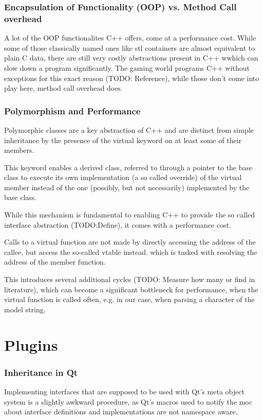 \subsubsection{Encapsulation of Functionality (OOP) vs. Method Call overhead}
A lot of the OOP functionalites C++ offers, come at a performance cost.
While some of those classically named ones like stl containers are almost equivalent to plain C data, there are still very costly abstractions present in C++ wwhich can slow down a program significantly.
The gaming world programs C++ without exceptions for this exact reason (TODO: Reference), while those don't come into play here, method call overhead does.

\subsubsection{Polymorphism and Performance}
Polymorphic classes are a key abstraction of C++ and are distinct from simple inheritance by the presence of the virtual keyword on at least some of their members.

This keyword enables a derived class, referred to through a pointer to the base class to execute its own implementation (a so called override) of the virtual member instead of the one (possibly, but not necessarily) implemented by the base class.

While this mechanism is fundamental to enabling C++ to provide the so called interface abstraction (TODO:Define), it comes with a performance cost.

Calls to a virtual function are not made by directly accessing the address of the callee, but access the so-called vtable instead. which is tasked with resolving the address of the member function.

This introduces several additional cycles (TODO: Measure how many or find in literature), which can become a significant bottleneck for performance, when the virtual function is called often, e.g. in our case, when parsing a character of the model string.



\section{Plugins}
\subsubsection{Inheritance in Qt}
Implementing interfaces that are supposed to be used with Qt's meta object system is a slightly awkward procedure, as Qt's macros used to notify the moc about interface definitions and implementations are not namespace aware. 

